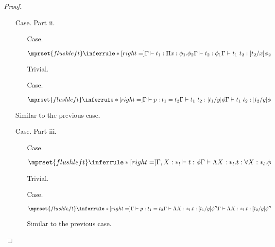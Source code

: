 \begin{proof}
\begin{itemize}
\item[Case.] Part ii.\\
  \begin{itemize}
  \item[Case.] \ \\
    \begin{center}
      \begin{math}
        $$\mprset{flushleft}
        \inferrule* [right=] {
          \Gamma \vdash t_1 : \Pi x:\phi_1.\phi_2 
          \\
          \Gamma \vdash t_2 : \phi_1
        }{\Gamma \vdash t_1\ t_2 : [t_2/x]\phi_2}
      \end{math}  
    \end{center}
    Trivial.
    
  \item[Case.] \ \\
    \begin{center}
      \begin{math}
        $$\mprset{flushleft}
        \inferrule* [right=] {
          \Gamma \vdash p:t_1 = t_2
          \\
          \Gamma \vdash t_1\ t_2:[t_1/y]\phi
        }{\Gamma \vdash t_1\ t_2:[t_2/y]\phi}
      \end{math}
    \end{center}
  \end{itemize}
  Similar to the previous case.

\item[Case.] Part iii.\\
  \begin{itemize}
  \item[Case.] \ \\
    \begin{center}
      \begin{math}
        $$\mprset{flushleft}
        \inferrule* [right=] {
          \Gamma, X : *_l \vdash t : \phi
        }{\Gamma \vdash \Lambda X:*_l.t:\forall X : *_l.\phi}
      \end{math}
    \end{center}
    Trivial.
    
  \item[Case.] \ \\
    \begin{center}
      \begin{math}
        $$\mprset{flushleft}
        \inferrule* [right=] {
          \Gamma \vdash p:t_1 = t_2
          \\
          \Gamma \vdash \Lambda X:*_l.t:[t_1/y]\phi''
        }{\Gamma \vdash \Lambda X:*_l.t:[t_2/y]\phi''}
      \end{math}
    \end{center}
    Similar to the previous case.
  \end{itemize}
  

\end{itemize}
\end{proof}
